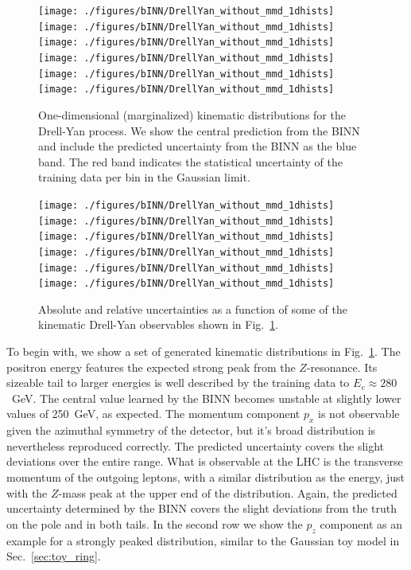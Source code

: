 \begin{figure}[t]
\texttt{[image: ./figures/bINN/DrellYan\_without\_mmd\_1dhists]}
\texttt{[image: ./figures/bINN/DrellYan\_without\_mmd\_1dhists]}
\texttt{[image: ./figures/bINN/DrellYan\_without\_mmd\_1dhists]}\\
\texttt{[image: ./figures/bINN/DrellYan\_without\_mmd\_1dhists]}
\texttt{[image: ./figures/bINN/DrellYan\_without\_mmd\_1dhists]}
\texttt{[image: ./figures/bINN/DrellYan\_without\_mmd\_1dhists]}
\caption{One-dimensional (marginalized) kinematic distributions for
  the Drell-Yan process.  We show the central prediction from the BINN
  and include the predicted uncertainty from the BINN as the blue
  band. The red band indicates the statistical uncertainty of the
  training data per bin in the Gaussian limit.}
\label{fig:DY}
\end{figure}

\begin{figure}[t]
\texttt{[image: ./figures/bINN/DrellYan\_without\_mmd\_1dhists]}
\texttt{[image: ./figures/bINN/DrellYan\_without\_mmd\_1dhists]}
\texttt{[image: ./figures/bINN/DrellYan\_without\_mmd\_1dhists]}\\
\texttt{[image: ./figures/bINN/DrellYan\_without\_mmd\_1dhists]}
\texttt{[image: ./figures/bINN/DrellYan\_without\_mmd\_1dhists]}
\texttt{[image: ./figures/bINN/DrellYan\_without\_mmd\_1dhists]}
\caption{Absolute and relative uncertainties as a function of some of
  the kinematic Drell-Yan observables shown in Fig.~\ref{fig:DY}.}
\label{fig:DY_unc}
\end{figure}

To begin with, we show a set of generated kinematic distributions in
Fig.~\ref{fig:DY}. The positron energy features the expected strong
peak from the $Z$-resonance. Its sizeable tail to larger energies is
well described by the training data to $E_e \approx 280$~GeV. The
central value learned by the BINN becomes unstable at slightly lower
values of 250~GeV, as expected. The momentum component $p_x$ is not
observable given the azimuthal symmetry of the detector, but it's
broad distribution is nevertheless reproduced correctly. The
predicted uncertainty covers the slight deviations over the entire
range. What is observable at the LHC is the transverse momentum of the
outgoing leptons, with a similar distribution as the energy, just with
the $Z$-mass peak at the upper end of the distribution. Again, the
predicted uncertainty determined by the BINN covers the slight
deviations from the truth on the pole and in both tails. In the second
row we show the $p_z$ component as an example for a strongly peaked
distribution, similar to the Gaussian toy model in
Sec.~\ref{sec:toy_ring}.

